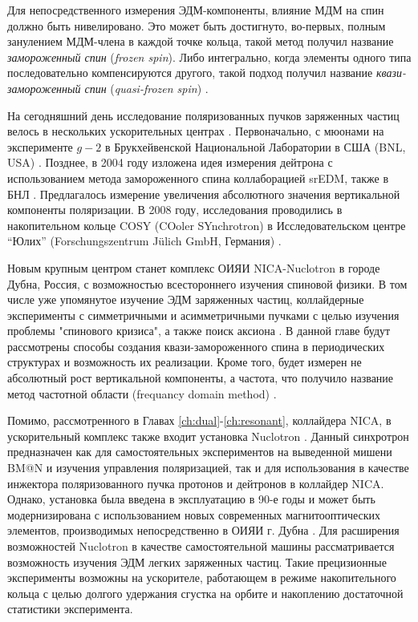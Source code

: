 \par Для непосредственного измерения ЭДМ-компоненты, влияние МДМ на спин должно быть нивелировано. Это может быть достигнуто, во-первых, полным занулением МДМ-члена в каждой точке кольца, такой метод получил название \textit{замороженный спин} (\textit{frozen spin}). Либо интегрально, когда элементы одного типа последовательно компенсируются другого, такой подход получил название \textit{квази-замороженный спин} (\textit{quasi-frozen spin}) \cite{QFS}.

\par На сегодняшний день исследование поляризованных пучков заряженных частиц велось в нескольких ускорительных центрах \cite{EDM_Yellow}. Первоначально, с мюонами на эксперименте $g-2$ в Брукхейвенской Национальной Лаборатории в США (BNL, USA) \cite{g-2}. Позднее, в 2004 году изложена идея измерения дейтрона с использованием метода замороженного спина коллаборацией srEDM, также в БНЛ \cite{Farley:edm}. Предлагалось измерение увеличения абсолютного значения вертикальной компоненты поляризации. В 2008 году, исследования проводились в накопительном кольце COSY (COoler SYnchrotron) в Исследовательском центре “Юлих” (Forschungszentrum Jülich GmbH, Германия) \cite{Farley:edm}.

\par Новым крупным центром станет комплекс ОИЯИ NICA-Nuclotron в городе Дубна, Россия, с возможностью всестороннего изучения спиновой физики. В том числе уже упомянутое изучение ЭДМ заряженных частиц, коллайдерные эксперименты с симметричными и асимметричными пучками с целью изучения проблемы "спинового кризиса"\cite{ST_Filatov}, а также поиск аксиона \cite{Axion_Nikolaev}. В данной главе будут рассмотрены способы создания квази-замороженного спина в периодических структурах и возможность их реализации. Кроме того, будет измерен не абсолютный рост вертикальной компоненты, а частота, что получило название метод частотной области (frequancy domain method) \cite{FDM}.

\par Помимо, рассмотренного в Главах \ref{ch:dual}-\ref{ch:resonant}, коллайдера NICA, в ускорительный комплекс также входит установка Nuclotron \cite{nuclotron24}. Данный синхротрон предназначен как для самостоятельных экспериментов на выведенной мишени BM@N и изучения управления поляризацией, так и для использования в качестве инжектора поляризованного пучка протонов и дейтронов в коллайдер NICA. Однако, установка была введена в эксплуатацию в 90-е годы \cite{baldin:nuclotron} и может быть модернизирована с использованием новых современных магнитооптических элементов, производимых непосредственно в ОИЯИ г. Дубна \cite{korovkin:nica_magnets}. Для расширения возможностей Nuclotron в качестве самостоятельной машины рассматривается возможность изучения ЭДМ легких заряженных частиц. Такие прецизионные эксперименты возможны на ускорителе, работающем в режиме накопительного кольца с целью долгого удержания сгустка на орбите и накоплению достаточной статистики эксперимента. 

